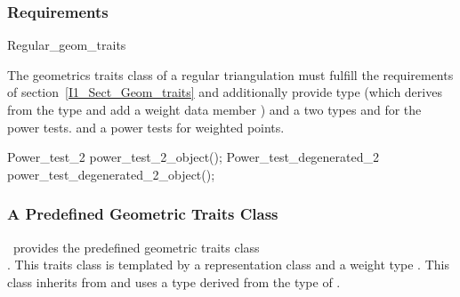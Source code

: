 \subsubsection{Requirements}
\begin{ccClass} {Regular_geom_traits}


The geometrics traits class of a regular triangulation
must fulfill the requirements of section~\ref{I1_Sect_Geom_traits}
and additionally provide  
 type (which derives from the type  
and add a weight data member )
and a two types  and 
for the power tests.
and a  power tests for weighted points.


\ccThreeToTwo

\ccTypes
{}
\ccGlue    
{}

\ccGlue
{}


\ccMethod
{Power_test_2   power_test_2_object();}{}
\ccMethod
{Power_test_degenerated_2  power_test_degenerated_2_object();}{}







  
\end{ccClass}

\subsubsection{A Predefined Geometric Traits Class}
\cgal\ provides the predefined geometric traits class \\
.
This traits class is templated by a representation class 
and a weight type .
This class inherits from
and uses a  type
derived from the type  of
.

